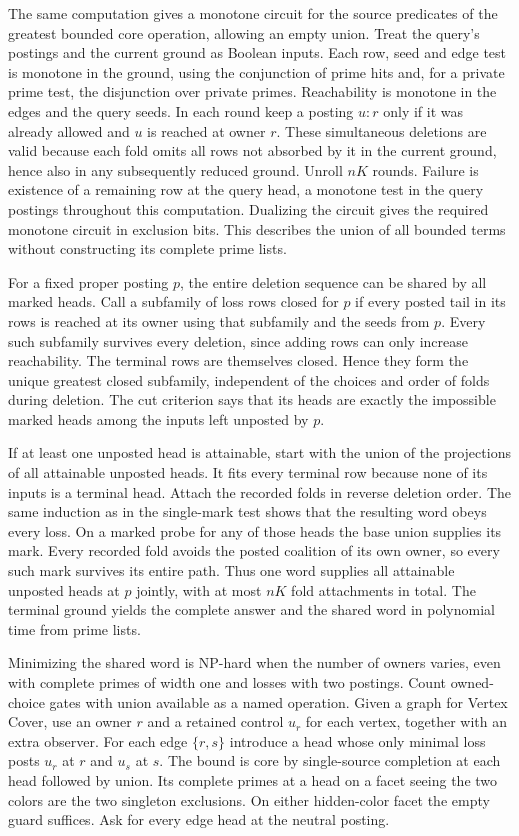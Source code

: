 The same computation gives a monotone circuit for
the source predicates of the greatest bounded core
operation, allowing an empty union. Treat the query's
postings and the current ground as Boolean inputs.
Each row, seed and edge test is monotone in the ground,
using the conjunction of prime hits and, for a private
prime test, the disjunction over private primes.
Reachability is monotone in the edges and the query
seeds. In each round keep a posting $u:r$ only if it
was already allowed and $u$ is reached at owner $r$.
These simultaneous deletions are valid because each
fold omits all rows not absorbed by it in the current
ground, hence also in any subsequently reduced ground.
Unroll $nK$ rounds. Failure is existence of a remaining
row at the query head, a monotone test in the query
postings throughout this computation. Dualizing the
circuit gives the required monotone circuit in exclusion
bits. This describes the union of all bounded terms
without constructing its complete prime lists.

For a fixed proper posting $p$, the entire deletion
sequence can be shared by all marked heads. Call a
subfamily of loss rows closed for $p$ if every posted
tail in its rows is reached at its owner using that
subfamily and the seeds from $p$. Every such subfamily
survives every deletion, since adding rows can only
increase reachability. The terminal rows are themselves
closed. Hence they form the unique greatest closed
subfamily, independent of the choices and order of
folds during deletion. The cut criterion says that
its heads are exactly the impossible marked heads
among the inputs left unposted by $p$.

If at least one unposted head is attainable, start with
the union of the projections of all attainable unposted
heads. It fits every terminal row because none of its
inputs is a terminal head. Attach the recorded folds in
reverse deletion order. The same induction as in the
single-mark test shows that the resulting word obeys
every loss. On a marked probe for any of those heads
the base union supplies its mark. Every recorded fold
avoids the posted coalition of its own owner, so every
such mark survives its entire path. Thus one word
supplies all attainable unposted heads at $p$ jointly,
with at most $nK$ fold attachments in total. The
terminal ground yields the complete answer and
the shared word in polynomial time from prime lists.

Minimizing the shared word is NP-hard when the number
of owners varies, even with complete primes of width
one and losses with two postings. Count owned-choice
gates with union available as a named operation.
Given a graph for Vertex Cover, use an owner $r$ and
a retained control $u_r$ for each vertex, together with
an extra observer. For each edge $\{r,s\}$ introduce a
head whose only minimal loss posts $u_r$ at $r$ and
$u_s$ at $s$. The bound is core by single-source
completion at each head followed by union. Its
complete primes at a head on a facet seeing the
two colors are the two singleton exclusions. On
either hidden-color facet the empty guard suffices.
Ask for every edge head at the neutral posting.

